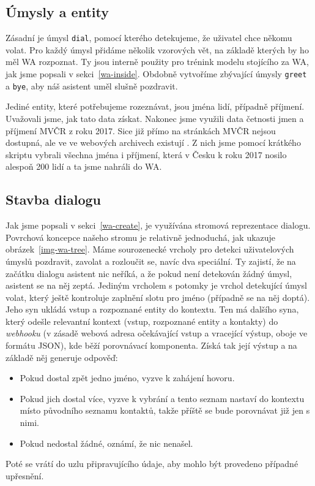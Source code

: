 \subsection{Úmysly a entity}\label{intents-entities}

Zásadní je úmysl
\texttt{dial}, pomocí kterého detekujeme, že uživatel chce někomu volat. Pro
každý úmysl přidáme několik vzorových vět, na základě kterých by ho měl WA
rozpoznat. Ty jsou interně použity pro trénink modelu stojícího za WA, jak
jsme popsali v sekci~\ref{wa-inside}.
Obdobně vytvoříme zbývající úmysly \texttt{greet} a \texttt{bye}, aby náš
asistent uměl slušně pozdravit.

Jediné entity, které potřebujeme rozeznávat, jsou jména lidí, případně příjmení.
Uvažovali jsme, jak tato
data získat. Nakonec jsme využili data četnosti jmen a příjmení MVČR z roku 2017.
Sice již přímo na stránkách MVČR nejsou dostupná, ale ve ve webových archivech
existují \citep{mvcr_cetnost_2018}. Z nich jsme pomocí krátkého skriptu vybrali
všechna jména i příjmení, která v Česku k roku 2017 nosilo alespoň
200 lidí a ta jsme nahráli do WA.

\subsection{Stavba dialogu}\label{building-dialog}

Jak jsme popsali v sekci~\ref{wa-create}, je využívána stromová reprezentace dialogu.
Povrchová koncepce našeho stromu je relativně jednoduchá, jak ukazuje obrázek~\ref{img-wa-tree}.
Máme sourozenecké
vrcholy pro detekci uživatelových úmyslů pozdravit, zavolat a rozloučit se, navíc
dva speciální. Ty zajistí, že na začátku dialogu asistent nic neříká, a že
pokud není detekován žádný úmysl, asistent se na něj zeptá. Jediným vrcholem
s potomky je vrchol detekující úmysl volat, který ještě kontroluje zaplnění slotu
pro jméno (případně se na něj doptá). Jeho syn ukládá vstup a rozpoznané entity
do kontextu. Ten
má dalšího syna, který odešle relevantní kontext (vstup, rozpoznané entity a kontakty)
do \textit{webhooku} (v zásadě webová adresa očekávající vstup a vracející
výstup, oboje ve formátu JSON), kde běží porovnávací komponenta. Získá tak její
výstup a na základě něj generuje odpověď:
\begin{itemize}
    \item Pokud dostal zpět jedno jméno, vyzve k zahájení hovoru.
    \item Pokud jich dostal více, vyzve k vybrání a tento seznam nastaví do kontextu místo původního
          seznamu kontaktů, takže příště se bude porovnávat již jen s nimi.
    \item Pokud nedostal žádné, oznámí, že nic nenašel.
\end{itemize}
Poté se vrátí do uzlu připravujícího údaje, aby mohlo být provedeno případné
upřesnění.

